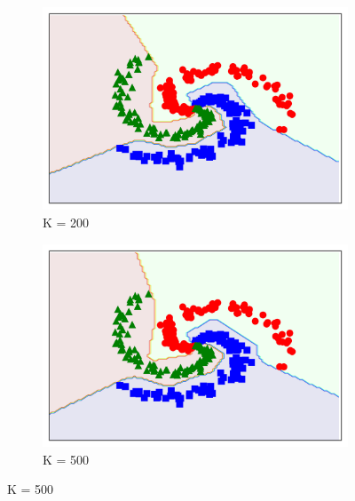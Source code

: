\documentclass[12pt,letterpaper]{article}
\begin{document}
\begin{figure}
\captionsetup[subfigure]{labelformat=empty}
\centering
\begin{subfigure}{.5\textwidth}
  \centering
  \includegraphics[width=1\linewidth]{EX200.png}
  \caption{K = 200}
  \label{fig:sub3}
\end{subfigure}%
\begin{subfigure}{.5\textwidth}
  \centering
  \includegraphics[width=1\linewidth]{EX500.png}
  \caption{K = 500}
  \label{fig:sub4}
\end{subfigure}
\label{fig:test}
\end{figure}
\end{document}
